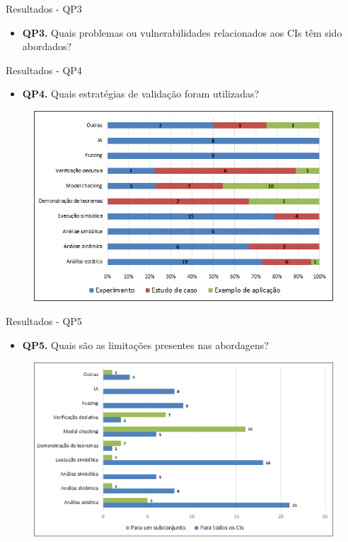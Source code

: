\begin{frame}{Resultados - QP3}
    \begin{itemize}
        \item \textbf{QP3.} Quais problemas ou vulnerabilidades relacionados aos CIs têm sido abordados?
    \end{itemize}
    
\end{frame}

\begin{frame}{Resultados - QP4}
    \begin{itemize}
        \item \textbf{QP4.} Quais estratégias de validação foram utilizadas?
    \end{itemize}
    \begin{figure}[!htb]
     \centering
     \includegraphics[scale=0.5]{figuras/metodologia/rq4-validacao-propostas.png}
    \end{figure}    
\end{frame}

\begin{frame}{Resultados - QP5}
    \begin{itemize}
        \item \textbf{QP5.} Quais são as limitações presentes nas abordagens?
    \end{itemize}
    \begin{figure}[!htb]
     \centering
     \includegraphics[scale=0.4]{figuras/metodologia/rq5-abrangencia.png}
    \end{figure}     
\end{frame}

